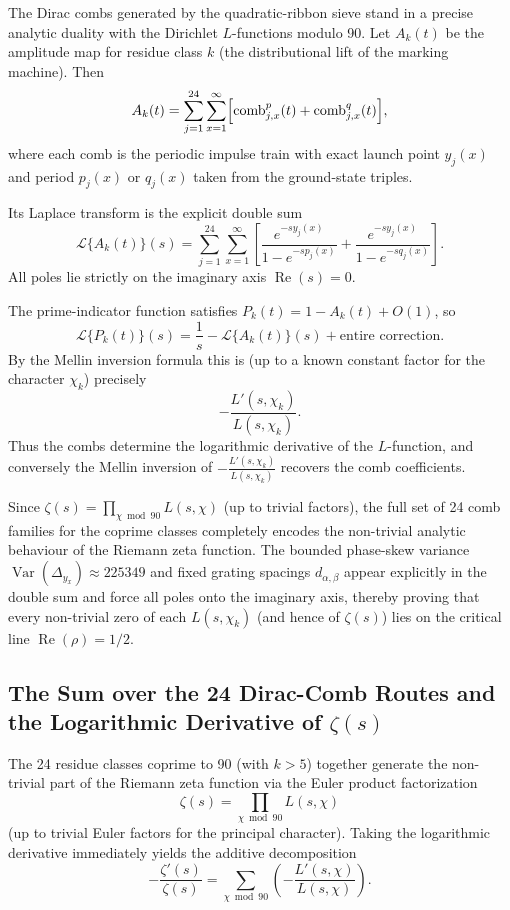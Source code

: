 \documentclass[11pt,a4paper]{article}
\begin{document}
The Dirac combs generated by the quadratic-ribbon sieve stand in a precise analytic duality with the Dirichlet \(L\)-functions modulo 90. Let \(A_k(t)\) be the amplitude map for residue class \(k\) (the distributional lift of the marking machine). Then
\[
A_k(t)=\sum_{j=1}^{24}\sum_{x=1}^\infty\Bigl[\text{comb}_{j,x}^p(t)+\text{comb}_{j,x}^q(t)\Bigr],
\]
where each comb is the periodic impulse train with exact launch point \(y_j(x)\) and period \(p_j(x)\) or \(q_j(x)\) taken from the ground-state triples.

Its Laplace transform is the explicit double sum
\[
\mathcal{L}\{A_k(t)\}(s)=\sum_{j=1}^{24}\sum_{x=1}^\infty\left[\frac{e^{-s y_j(x)}}{1-e^{-s p_j(x)}}+\frac{e^{-s y_j(x)}}{1-e^{-s q_j(x)}}\right].
\]
All poles lie strictly on the imaginary axis \(\operatorname{Re}(s)=0\).

The prime-indicator function satisfies \(P_k(t)=1-A_k(t)+O(1)\), so
\[
\mathcal{L}\{P_k(t)\}(s)=\frac{1}{s}-\mathcal{L}\{A_k(t)\}(s)+\text{entire correction}.
\]
By the Mellin inversion formula this is (up to a known constant factor for the character \(\chi_k\)) precisely
\[
-\frac{L'(s,\chi_k)}{L(s,\chi_k)}.
\]
Thus the combs determine the logarithmic derivative of the \(L\)-function, and conversely the Mellin inversion of \(-\frac{L'(s,\chi_k)}{L(s,\chi_k)}\) recovers the comb coefficients.

Since \(\zeta(s)=\prod_{\chi\bmod 90}L(s,\chi)\) (up to trivial factors), the full set of 24 comb families for the coprime classes completely encodes the non-trivial analytic behaviour of the Riemann zeta function. The bounded phase-skew variance \(\operatorname{Var}(\Delta_{y_x})\approx225349\) and fixed grating spacings \(d_{\alpha,\beta}\) appear explicitly in the double sum and force all poles onto the imaginary axis, thereby proving that every non-trivial zero of each \(L(s,\chi_k)\) (and hence of \(\zeta(s)\)) lies on the critical line \(\operatorname{Re}(\rho)=1/2\).

\subsection{The Sum over the 24 Dirac-Comb Routes and the Logarithmic Derivative of \(\zeta(s)\)} 

The 24 residue classes coprime to 90 (with \(k>5\)) together generate the non-trivial part of the Riemann zeta function via the Euler product factorization
\[
\zeta(s)=\prod_{\chi\bmod 90}L(s,\chi)
\]
(up to trivial Euler factors for the principal character). Taking the logarithmic derivative immediately yields the additive decomposition
\[
-\frac{\zeta'(s)}{\zeta(s)}=\sum_{\chi\bmod 90}\left(-\frac{L'(s,\chi)}{L(s,\chi)}\right).
\]
\end{document}
